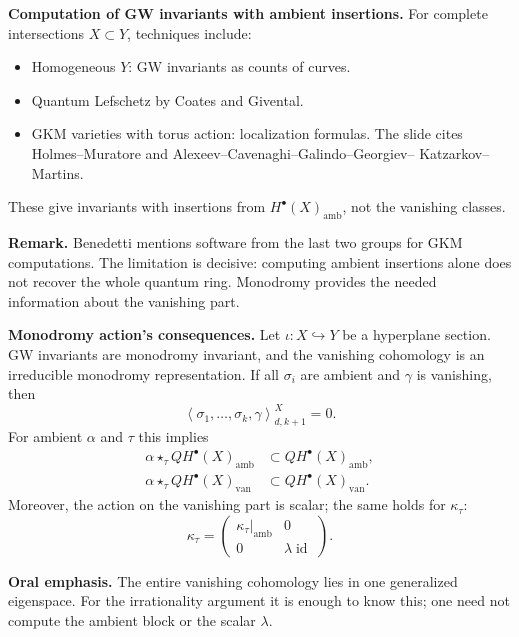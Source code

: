 \medskip\noindent
\textbf{Computation of GW invariants with
ambient insertions.}
For complete intersections $X\subset Y$,
techniques include:
\begin{itemize}
\item Homogeneous $Y$: GW invariants as
counts of curves.
\item Quantum Lefschetz by Coates and
Givental.
\item GKM varieties with torus action:
localization formulas. The slide cites
Holmes--Muratore and
Alexeev--Cavenaghi--Galindo--Georgiev--
Katzarkov--Martins.
\end{itemize}
These give invariants with insertions from
$H^\bullet(X)_{\mathrm{amb}}$, not the
vanishing classes.

\textbf{Remark.}
Benedetti mentions software from the last
two groups for GKM computations. The
limitation is decisive: computing ambient
insertions alone does not recover the
whole quantum ring. Monodromy provides the
needed information about the vanishing part.

\medskip\noindent
\textbf{Monodromy action's consequences.}
Let $\iota:X\hookrightarrow Y$ be a
hyperplane section. GW invariants are
monodromy invariant, and the vanishing
cohomology is an irreducible monodromy
representation.
If all $\sigma_i$ are ambient and $\gamma$
is vanishing, then
$$
\left\langle\sigma_1,\ldots,\sigma_k,
\gamma\right\rangle^X_{d,k+1}=0.
$$
For ambient $\alpha$ and $\tau$ this implies
$$
\begin{aligned}
\alpha\star_\tau
QH^\bullet(X)_{\mathrm{amb}}
&\subset QH^\bullet(X)_{\mathrm{amb}},\\
\alpha\star_\tau
QH^\bullet(X)_{\mathrm{van}}
&\subset QH^\bullet(X)_{\mathrm{van}}.
\end{aligned}
$$
Moreover, the action on the vanishing part
is scalar; the same holds for $\kappa_\tau$:
$$
\kappa_\tau=
\begin{pmatrix}
\kappa_\tau|_{\mathrm{amb}}&0\\
0&\lambda\operatorname{id}
\end{pmatrix}.
$$

\textbf{Oral emphasis.}
The entire vanishing cohomology lies in
one generalized eigenspace. For the
irrationality argument it is enough to
know this; one need not compute the
ambient block or the scalar $\lambda$.

